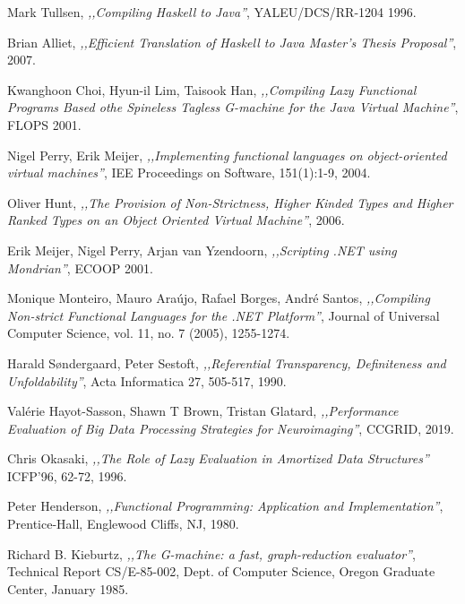 \documentclass[en]{pracamgr}
\begin{document}
\begin{thebibliography}{99}

 Mark Tullsen, \textit{,,Compiling Haskell to Java''}, YALEU/DCS/RR-1204
1996.

 Brian Alliet, \textit{,,Efficient Translation of Haskell to Java
Master’s Thesis Proposal''}, 2007.

 Kwanghoon Choi, Hyun-il Lim, Taisook Han, \textit{,,Compiling Lazy Functional Programs Based othe Spineless Tagless G-machine for the Java Virtual Machine''}, FLOPS 2001.

 Nigel Perry, Erik Meijer, \textit{,,Implementing functional languages on object-oriented virtual machines''}, IEE Proceedings on Software, 151(1):1-9, 2004.

 Oliver Hunt, \textit{,,The Provision of Non-Strictness, Higher Kinded Types
and Higher Ranked Types on an Object Oriented Virtual Machine''}, 2006.

 Erik Meijer, Nigel Perry, Arjan van Yzendoorn, \textit{,,Scripting .NET using Mondrian''}, ECOOP 2001.

 Monique Monteiro, Mauro Ara\'ujo, Rafael Borges, Andr\'e Santos,  \textit{,,Compiling Non-strict Functional Languages for the .NET Platform''}, Journal of Universal Computer Science, vol. 11, no. 7 (2005), 1255-1274.

 Harald Søndergaard, Peter Sestoft, \textit{,,Referential Transparency, Definiteness and Unfoldability''}, Acta Informatica 27, 505-517, 1990.

 Val\'erie Hayot-Sasson, Shawn T Brown, Tristan Glatard, \textit{,,Performance Evaluation of Big Data Processing Strategies for Neuroimaging''}, CCGRID, 2019.

 Chris Okasaki, \textit{,,The Role of Lazy Evaluation in Amortized Data Structures''} ICFP'96, 62-72, 1996.

 Peter Henderson, \textit{,,Functional Programming: Application and Implementation''},
Prentice-Hall, Englewood Cliffs, NJ, 1980.

 Richard B. Kieburtz, \textit{,,The G-machine: a fast, graph-reduction evaluator''}, Technical Report CS/E-85-002, Dept. of Computer Science, Oregon Graduate Center, January 1985.


\end{thebibliography}
\end{document}
